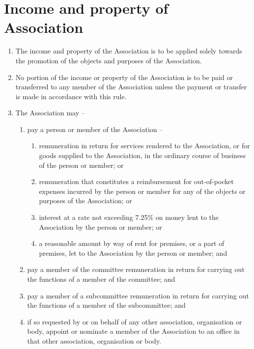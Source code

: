 \section{Income and property of Association}
\label{rule:income}

\begin{enumerate}
	\item The income and property of the Association is to be applied solely towards the promotion of the objects and purposes of the Association.
	\item No portion of the income or property of the Association is to be paid or transferred to any member of the Association unless the payment or transfer is made in accordance with this rule.
	
	\item \label{subrule:income:payingOthers} The Association may --
	\begin{enumerate}
		\item \label{subrule:income:payingOthers:members} pay a person or member of the Association --
		\begin{enumerate}
			\item \label{subsubrule:income:payingOthers:goodsAndServices} remuneration in return for services rendered to the Association, or for goods supplied to the Association, in the ordinary course of business of the person or member; or
			\item \label{subsubrule:income:payingOthers:expenses} remuneration that constitutes a reimbursement for out-of-pocket expenses incurred by the person or member for any of the objects or purposes of the Association; or
			\item \label{subsubrule:income:payingOthers:interest} interest at a rate not exceeding 7.25\% on money lent to the Association by the person or member; or
			\item \label{subsubrule:income:payingOthers:rent} a reasonable amount by way of rent for premises, or a part of premises, let to the Association by the person or member; and
		\end{enumerate}
		
		\item \label{subrule:income:payingOthers:committee} pay a member of the committee remuneration in return for carrying out the functions of a member of the committee; and
		\item \label{subrule:income:payingOthers:subcommittee} pay a member of a subcommittee remuneration in return for carrying out the functions of a member of the subcommittee; and
		\item \label{subrule:income:payingOthers:associations} if so requested by or on behalf of any other association, organisation or body, appoint or nominate a member of the Association to an office in that other association, organisation or body.
	\end{enumerate}
	

\end{enumerate}
